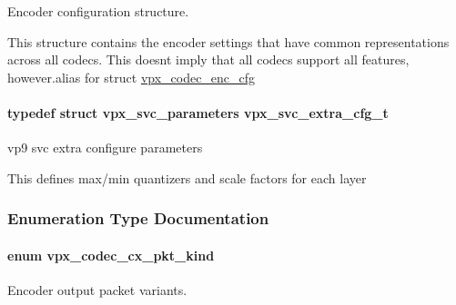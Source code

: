 Encoder configuration structure. 

This structure contains the encoder settings that have common representations across all codecs. This doesn\textquotesingle{}t imply that all codecs support all features, however.\+alias for struct \hyperlink{structvpx__codec__enc__cfg}{vpx\+\_\+codec\+\_\+enc\+\_\+cfg} 
\paragraph[{\texorpdfstring{vpx\+\_\+svc\+\_\+extra\+\_\+cfg\+\_\+t}{vpx_svc_extra_cfg_t}}]{\setlength{\rightskip}{0pt plus 5cm}typedef struct {\bf vpx\+\_\+svc\+\_\+parameters}  {\bf vpx\+\_\+svc\+\_\+extra\+\_\+cfg\+\_\+t}}\hypertarget{group__encoder_gaa7648cca6bd9745ea80ffb67c32d39ea}{}\label{group__encoder_gaa7648cca6bd9745ea80ffb67c32d39ea}


vp9 svc extra configure parameters 

This defines max/min quantizers and scale factors for each layer 

\subsubsection{Enumeration Type Documentation}
\paragraph[{\texorpdfstring{vpx\+\_\+codec\+\_\+cx\+\_\+pkt\+\_\+kind}{vpx_codec_cx_pkt_kind}}]{\setlength{\rightskip}{0pt plus 5cm}enum {\bf vpx\+\_\+codec\+\_\+cx\+\_\+pkt\+\_\+kind}}\hypertarget{group__encoder_ga28a79375279536526552af3a83d2ed72}{}\label{group__encoder_ga28a79375279536526552af3a83d2ed72}


Encoder output packet variants. 

